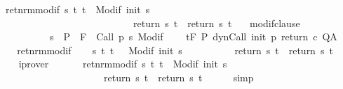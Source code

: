\begin{isabellebody}
\ \ \ ret{\isacharunderscore}nrm{\isacharunderscore}modif{\isacharcolon}\ {\isachardoublequoteopen}{\isasymforall}s\ t{\isachardot}\ t\ {\isasymin}\ {\isacharparenleft}Modif\ {\isacharparenleft}init\ s{\isacharparenright}{\isacharparenright}\ \isanewline
\ \ \ \ \ \ \ \ \ \ \ \ \ \ \ \ \ \ \ \ \ \ \ \ \ \ \ \ {\isasymlongrightarrow}\ return{\isacharprime}\ s\ t\ {\isacharequal}\ return\ s\ t{\isachardoublequoteclose}\isanewline
\ \ \ modif{\isacharunderscore}clause{\isacharcolon}\ \isanewline
\ \ \ \ \ \ \ \ \ \ \ \ {\isachardoublequoteopen}{\isasymforall}s\ {\isasymin}\ P{\isachardot}\ {\isasymforall}{\isasymsigma}{\isachardot}\ {\isasymGamma}{\isacharcomma}{\isasymTheta}{\isasymturnstile}\isactrlbsub {\isacharslash}F\isactrlesub \ {\isacharbraceleft}{\isasymsigma}{\isacharbraceright}\ {\isacharparenleft}Call\ {\isacharparenleft}p\ s{\isacharparenright}{\isacharparenright}\ {\isacharparenleft}Modif\ {\isasymsigma}{\isacharparenright}{\isacharcomma}{\isacharbraceleft}{\isacharbraceright}{\isachardoublequoteclose}\isanewline
\ \ \ {\isachardoublequoteopen}{\isasymGamma}{\isacharcomma}{\isasymTheta}{\isasymturnstile}\isactrlsub t\isactrlbsub {\isacharslash}F\isactrlesub \ P\ {\isacharparenleft}dynCall\ init\ p\ return\ c{\isacharparenright}\ Q{\isacharcomma}A{\isachardoublequoteclose}\isanewline
%
\isadelimproof
%
\endisadelimproof
%
\isatagproof
{}\isamarkupfalse%
\ {\isacharminus}\isanewline
\ \ \isamarkupfalse%
\ ret{\isacharunderscore}nrm{\isacharunderscore}modif\isanewline
\ \ \isamarkupfalse%
\ {\isachardoublequoteopen}{\isasymforall}s\ t{\isachardot}\ t\ \ {\isasymin}\ {\isacharparenleft}Modif\ {\isacharparenleft}init\ s{\isacharparenright}{\isacharparenright}\ \isanewline
\ \ \ \ \ \ \ \ {\isasymlongrightarrow}\ return{\isacharprime}\ s\ t\ {\isacharequal}\ return\ s\ t{\isachardoublequoteclose}\isanewline
\ \ \ \ \isamarkupfalse%
\ iprover\isanewline
\ \ \isamarkupfalse%
\isanewline
\ \ \isamarkupfalse%
\ ret{\isacharunderscore}nrm{\isacharunderscore}modif{\isacharprime}{\isacharcolon}\ {\isachardoublequoteopen}{\isasymforall}s\ t{\isachardot}\ t\ {\isasymin}\ {\isacharparenleft}Modif\ {\isacharparenleft}init\ s{\isacharparenright}{\isacharparenright}\ \isanewline
\ \ \ \ \ \ \ \ \ \ \ \ \ \ \ \ \ \ \ \ \ \ {\isasymlongrightarrow}\ return{\isacharprime}\ s\ t\ {\isacharequal}\ return\ s\ t{\isachardoublequoteclose}\isanewline
\ \ \ \ \isamarkupfalse%
\ simp\isanewline
\ \ \isamarkupfalse%

\end{isabellebody}
